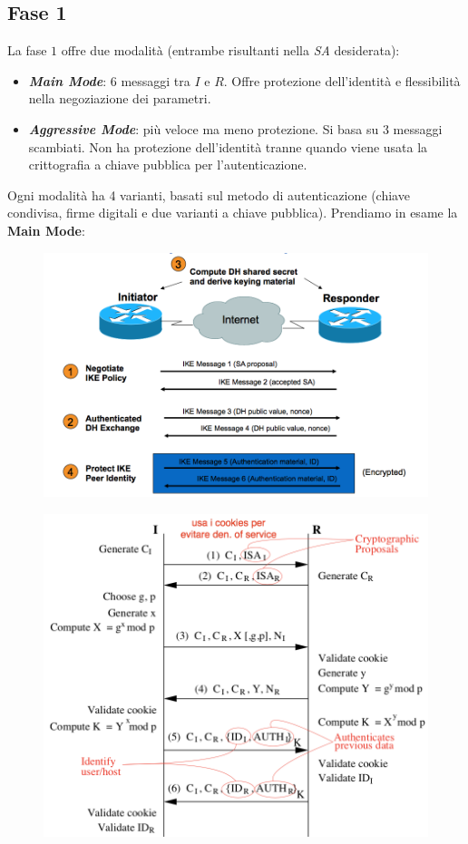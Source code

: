 \documentclass[11pt, a4paper, twoside, italian]{report}
\theoremstyle{plain}
\begin{document}
\subsection*{Fase 1}
La fase $1$ offre due modalità (entrambe risultanti nella \textit{SA} desiderata):
\begin{itemize}
	\item \textbf{\textit{Main Mode}}: 6 messaggi tra $I$ e $R$. Offre protezione dell'identità e flessibilità nella negoziazione dei parametri.
	\item \textbf{\textit{Aggressive Mode}}: più veloce ma meno protezione. Si basa su 3 messaggi scambiati. Non ha protezione dell'identità tranne quando viene usata la crittografia a chiave pubblica per l'autenticazione.
\end{itemize}
Ogni modalità ha 4 varianti, basati sul metodo di autenticazione (chiave condivisa, firme digitali e due varianti a chiave pubblica). Prendiamo in esame la \textbf{Main Mode}:
\begin{multicols}{2}
	\begin{figure}[H]
		\centering
		\includegraphics[scale=0.62]{ikefase1mainmode}
	\end{figure}
\columnbreak
	\begin{figure}[H]
		\centering
		\includegraphics[scale=0.54]{ikefase1mainmodeschematico}
	\end{figure}
\end{multicols}
\end{document}
